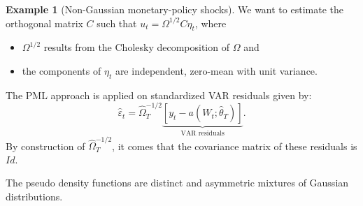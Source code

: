 \documentclass[
  12pt,
]{book}
\providecommand{\tightlist}{%
  \setlength{\itemsep}{0pt}\setlength{\parskip}{0pt}}
\theoremstyle{definition}
\theoremstyle{definition}
\newtheorem{example}{Example}[chapter]
\theoremstyle{definition}
\theoremstyle{definition}
\theoremstyle{remark}
\begin{document}
\begin{example}[Non-Gaussian monetary-policy shocks]
We want to estimate the orthogonal matrix \(C\) such that \(u_t=\Omega^{1/2}C \eta_t\), where

\begin{itemize}
\tightlist
\item
  \(\Omega^{1/2}\) results from the Cholesky decomposition of \(\Omega\) and
\item
  the components of \(\eta_t\) are independent, zero-mean with unit variance.
\end{itemize}

The PML approach is applied on standardized VAR residuals given by:
\[
\hat\varepsilon_t = \hat\Omega^{-1/2}_T\underbrace{[y_t - a(W_t;\hat\theta_T)]}_{\mbox{VAR residuals}}.
\]
By construction of \(\hat\Omega^{-1/2}_T\), it comes that the covariance matrix of these residuals is \(Id\).

The pseudo density functions are distinct and asymmetric mixtures of Gaussian distributions.


\end{example}
\end{document}
